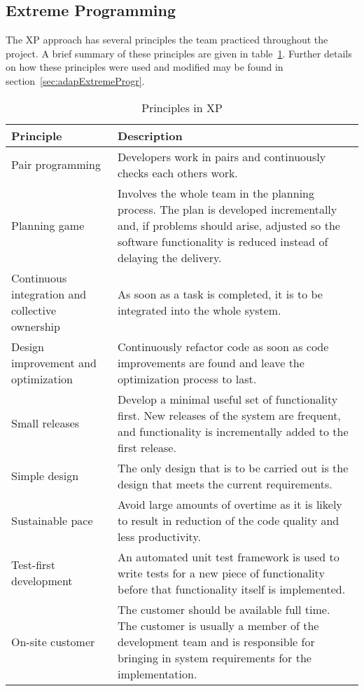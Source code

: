 \subsection{Extreme Programming}
The XP approach has several principles the team practiced throughout the project. A brief summary of these principles are given in table~\ref{tab:exProg}. Further details on how these principles were used and modified may be found in section~\ref{sec:adapExtremeProgr}.

\begin{table}[H]
\begin{tabular}{|p{4cm}|p{11.7cm}|}
\hline
\textbf{Principle} & \textbf{Description} \\\hline
Pair programming & Developers work in pairs and continuously checks each others work.\\\hline
Planning game & Involves the whole team in the planning process. The plan is developed incrementally and, if problems should arise, adjusted so the software functionality is reduced instead of delaying the delivery.
\\\hline
Continuous integration and collective ownership& As soon as a task is completed, it is to be integrated into the whole system.\\\hline
Design improvement and optimization & Continuously refactor code as soon as code improvements are found and leave the optimization process to last. \\\hline
Small releases & Develop a minimal useful set of functionality first. New releases of the system are frequent, and functionality is incrementally added to the first release.\\\hline
Simple design & The only design that is to be carried out is the design that meets the current requirements.\\\hline
Sustainable pace & Avoid large amounts of overtime as it is likely to result in reduction of the code quality and less productivity. \\\hline
Test-first development & An automated unit test framework is used to write tests for a new piece of functionality before that functionality itself is implemented. \\\hline
On-site customer & The customer should be available full time. The customer is usually a member of the development team and is responsible for bringing in system requirements for the implementation.\\\hline
\end{tabular}
\caption{Principles in XP}
\label{tab:exProg}
\end{table}

